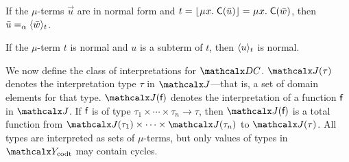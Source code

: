 \begin{rep}
\begin{lemma}
\label{lem:mu-norm-arg}
If the $\mu$-terms $\vec u$ are in normal form and $t = \nf{\MU x.\; \const{C}( \vec u )} = \MU x.\; \const{C}( \vec w )$,
then $\vec u \vsim \expand{t}{\vec w}$\vthinspace.
\end{lemma}

\begin{lemma}
\label{lem:mu-norm-interp}
If the $\mu$-term $t$ is normal and $u$ is a subterm of $t$, then $\expand{t}{u}$ is normal.
\end{lemma}

\end{rep}

We now define the class of interpretations for $\thD$.
$\interp{\J}{\tau}$ denotes the interpretation type $\tau$ in $\J$---that is, a set of
domain elements for that type.
$\interp{\J}{\const{f}}$ denotes the interpretation of a function $\const{f}$ in $\J$.
If $\const{f}$ is of type $ \tau_1 \times \cdots \times \tau_n \to \tau$,
then $\interp{\J}{\const{f}}$ is a total function from $\interp{\J}{\tau_1} \times \cdots \times \interp{\J}{\tau_n}$ to $\interp{\J}{\tau}$.
All types are interpreted as sets of $\mu$-terms, but
only values of types in $\Codata$ may contain cycles.

